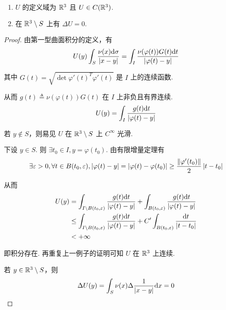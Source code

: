 \begin{property}
    \begin{enumerate}
        \item $U$ 的定义域为 $\mathbb{R}^3$ 且 $U\in C(\mathbb{R}^3)$.
        
        \item 在 $\mathbb{R}^3\setminus S$ 上有 $\Delta U=0$.
    \end{enumerate}
\end{property}
\begin{proof}
    由第一型曲面积分的定义，有
$$
U(y)\int_S\frac{\nu(x)\mathrm{d}\sigma}{\left\lvert{x-y}\right\rvert}=\int_I\frac{\nu(\varphi(t))G(t)\mathrm{d} t}{\left\lvert{\varphi(t)-y}\right\rvert}
$$

    其中 $G(t)=\displaystyle\sqrt{\det\varphi'(t)^T\varphi'(t)}$ 是 $I$ 上的连续函数.

    从而 $g(t)\triangleq\nu(\varphi(t))G(t)$ 在 $I$ 上非负且有界连续.
$$
U(y)=\int_I\frac{g(t)\mathrm{d} t}{\left\lvert{\varphi(t)-y}\right\rvert}
$$

    若 $y\notin S$，则易见 $U$ 在 $\mathbb{R}^3\setminus S$ 上 $C^\infty$ 光滑.

    下设 $y\in S$. 则 $\exists t_0\in I,y=\varphi(t_0)$. 由有限增量定理有
$$
\exists\varepsilon>0,\forall t\in B(t_0,\varepsilon),\left\lvert{\varphi(t)-y}\right\rvert=\left\lvert{\varphi(t)-\varphi(t_0)}\right\rvert\ge\frac{\left\lVert{\varphi'(t_0)}\right\rVert}{2}\left\lvert{t-t_0}\right\rvert
$$

    从而
$$
\begin{aligned}
    U(y)&=\int_{I\setminus B(t_0,\varepsilon)}\frac{g(t)\mathrm{d} t}{\left\lvert{\varphi(t)-y}\right\rvert}+\int_{B(t_0,\varepsilon)}\frac{g(t)\mathrm{d} t}{\left\lvert{\varphi(t)-y}\right\rvert}\\
    &\le\int_{I\setminus B(t_0,\varepsilon)}\frac{g(t)\mathrm{d} t}{\left\lvert{\varphi(t)-y}\right\rvert}+C'\int_{B(t_0,\varepsilon)}\frac{\mathrm{d} t}{\left\lvert{t-t_0}\right\rvert}\\
    &<+\infty
\end{aligned}
$$

    即积分存在. 再重复上一例子的证明可知 $U$ 在 $\mathbb{R}^3$ 上连续.

    若 $y\in\mathbb{R}^3\setminus S$，则
$$
\Delta U(y)=\int_S\nu(x)\Delta\frac{1}{\left\lvert{x-y}\right\rvert}\mathrm{d} x=0
$$
\end{proof}